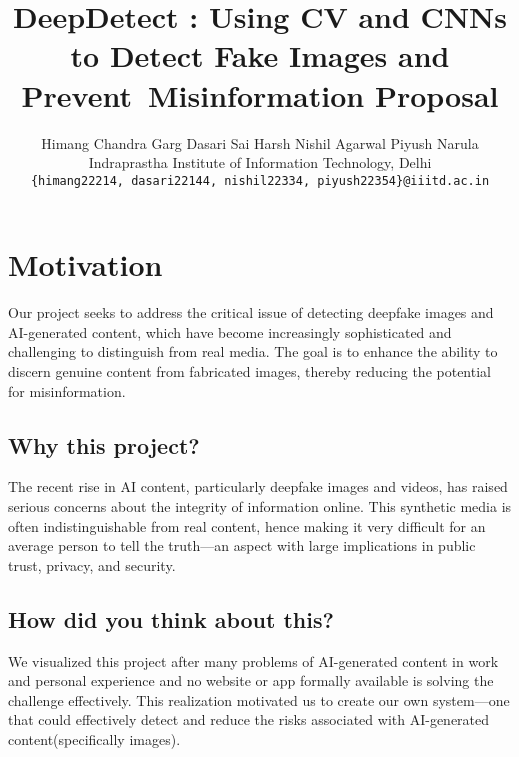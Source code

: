 \documentclass[10pt,twocolumn,letterpaper]{article}
\begin{document}
\title{DeepDetect : Using CV and CNNs to Detect Fake Images and Prevent Misinformation Proposal}

\author{Himang Chandra Garg \qquad Dasari Sai Harsh \qquad Nishil Agarwal \qquad Piyush Narula\\
Indraprastha Institute of Information Technology, Delhi\\
{\tt\small \{himang22214, dasari22144, nishil22334, piyush22354\}@iiitd.ac.in}
}

\maketitle

\pagestyle{empty}

\section{Motivation}

Our project seeks to address the critical issue of detecting deepfake images and AI-generated content, which have become increasingly sophisticated and challenging to distinguish from real media. 
The goal is to enhance the ability to discern genuine content from fabricated images, thereby reducing the potential for misinformation.

\subsection{Why this project?}

The recent rise in AI content, particularly deepfake images and videos, has raised serious concerns about the integrity of information online. 
This synthetic media is often indistinguishable from real content, hence making it very difficult for an average person to tell the truth—an aspect with large implications in public trust, privacy, and security.

\subsection{How did you think about this?}

We visualized this project after many problems of AI-generated content in work and personal experience and no website or app formally available is solving the challenge effectively. 
This realization motivated us to create our own system—one that could effectively detect and reduce the risks associated with AI-generated content(specifically images).
\end{document}
